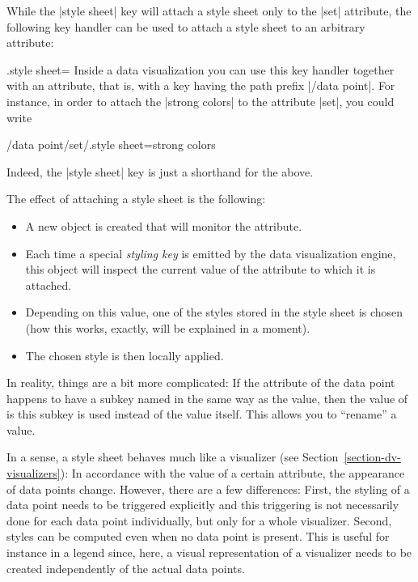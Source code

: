 While the |style sheet| key will attach a style sheet only to the |set|
attribute, the following key handler can be used to attach a style sheet to an
arbitrary attribute:

\begin{handler}{{.style sheet}=}
    Inside a data visualization you can use this key handler together with an
    attribute, that is, with a key having the path prefix |/data point|. For
    instance, in order to attach the  |strong colors| to the
    attribute |set|, you could write
\begin{codeexample}
/data point/set/.style sheet=strong colors
\end{codeexample}
    Indeed, the |style sheet| key is just a shorthand for the above.

    The effect of attaching a style sheet is the following:
    \begin{itemize}
        \item A new object is created that will monitor the attribute.
        \item Each time a special \emph{styling key} is emitted by the data
            visualization engine, this object will inspect the current value of
            the attribute to which it is attached.
        \item Depending on this value, one of the styles stored in the style
            sheet is chosen (how this works, exactly, will be explained in a
            moment).
        \item The chosen style is then locally applied.
    \end{itemize}

    In reality, things are a bit more complicated: If the attribute of the data
    point happens to have a subkey named in the same way as the value, then the
    value of is this subkey is used instead of the value itself. This allows
    you to ``rename'' a value.

    In a sense, a style sheet behaves much like a visualizer (see
    Section~\ref{section-dv-visualizers}): In accordance with the value of a
    certain attribute, the appearance of data points change. However, there are
    a few differences: First, the styling of a data point needs to be triggered
    explicitly and this triggering is not necessarily done for each data point
    individually, but only for a whole visualizer. Second, styles can be
    computed even when no data point is present. This is useful for instance in
    a legend since, here, a visual representation of a visualizer needs to be
    created independently of the actual data points.
\end{handler}


